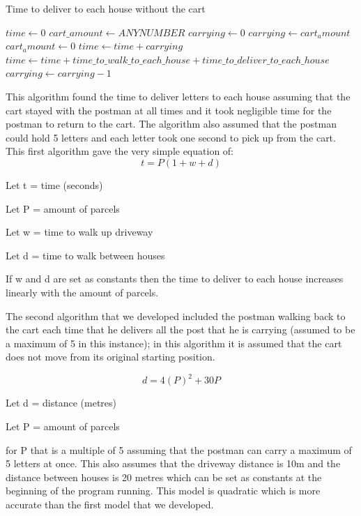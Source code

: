 \documentclass[14pt]{article}
\begin{document}
\begin{algorithm}
\caption{Time to deliver to each house without the cart}
\begin{algorithmic} 
\STATE $time \leftarrow 0$
\STATE $cart\_amount \leftarrow ANY NUMBER$
\STATE $carrying \leftarrow 0$
\ELSE
\STATE $carrying \leftarrow cart_amount$
\STATE $cart_amount \leftarrow 0$
\STATE $time \leftarrow time + carrying$
\ENDIF
{}
\STATE $time \leftarrow time + time\_to\_walk\_to\_each\_house + time\_to\_deliver\_to\_each\_house$
\STATE $carrying \leftarrow carrying - 1$
\ENDWHILE
\ENDWHILE
\end{algorithmic}
\end{algorithm}


This algorithm found the time to deliver letters to each house assuming that the cart stayed with the postman at all times and it took negligible time for the postman to return to the cart.  The algorithm also assumed that the postman could hold 5 letters and each letter took one second to pick up from the cart.
This first algorithm gave the very simple equation of:
\begin{equation}
    t = P(1+w+d)
\end{equation}

Let t = time (seconds)

Let P = amount of parcels

Let w = time to walk up driveway

Let d = time to walk between houses

If w and d are set as constants then the time to deliver to each house increases linearly with the amount of parcels.
 
The second algorithm that we developed included the postman walking back to the cart each time that he delivers all the post that he is carrying (assumed to be a maximum of 5 in this instance); in this algorithm it is assumed that the cart does not move from its original starting position.

\begin{equation}
    d = 4(P)^2 + 30P
\end{equation}

Let d = distance (metres)

Let P = amount of parcels

for P that is a multiple of 5 assuming that the postman can carry a maximum of 5 letters at once.
This also assumes that the driveway distance is 10m and the distance between houses is 20 metres which can be set as constants at the beginning of the program running. This model is quadratic which is more accurate than the first model that we developed.
 
\end{document}
